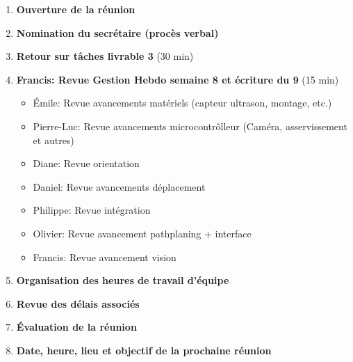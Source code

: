 \documentclass[12pt]{ULojpv}
\begin{document}
\entete
\begin{enumerate}
   \item \textbf{Ouverture de la réunion}
   \item \textbf{Nomination du secrétaire (procès verbal)}
   \item \textbf{Retour sur tâches livrable 3} (30 min)
   \item \textbf{Francis: Revue Gestion Hebdo semaine 8 et écriture du 9} (15 min)
   \begin{itemize}
   \item Émile: Revue avancements matériels (capteur ultrason, montage, etc.)
   \item Pierre-Luc: Revue avancements microcontrôlleur (Caméra, asservissement et autres) 
   \item Diane: Revue orientation
   \item Daniel: Revue avancements déplacement
   \item Philippe: Revue intégration
   \item Olivier: Revue avancement pathplaning + interface
   \item Francis: Revue avancement vision
   \end{itemize}
   \item \textbf{Organisation des heures de travail d'équipe}
   \item \textbf{Revue des délais associés}
   \item \textbf{Évaluation de la réunion}
   \item \textbf{Date, heure, lieu et objectif de la prochaine réunion}
\end{enumerate}
\end{document}
